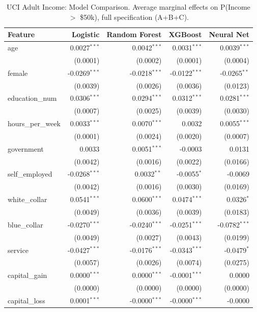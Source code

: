 \begin{table}[htbp]
\centering
\small
\begin{threeparttable}
\caption{UCI Adult Income: Model Comparison. Average marginal effects on P(Income $>$ \$50k), full specification (A+B+C).}
\label{tab:adult_model_comparison}
\begin{tabular}{lrrrr}
\toprule
Feature & Logistic & Random Forest & XGBoost & Neural Net \\
\midrule
age & 0.0027$^{***}$ & 0.0042$^{***}$ & 0.0031$^{***}$ & 0.0039$^{***}$ \\
 & (0.0001) & (0.0002) & (0.0001) & (0.0004) \\
female & -0.0269$^{***}$ & -0.0218$^{***}$ & -0.0122$^{***}$ & -0.0265$^{**}$ \\
 & (0.0039) & (0.0026) & (0.0036) & (0.0123) \\
education\_num & 0.0306$^{***}$ & 0.0294$^{***}$ & 0.0312$^{***}$ & 0.0281$^{***}$ \\
 & (0.0007) & (0.0025) & (0.0039) & (0.0030) \\
\midrule
hours\_per\_week & 0.0033$^{***}$ & 0.0070$^{***}$ & 0.0032 & 0.0055$^{***}$ \\
 & (0.0001) & (0.0024) & (0.0020) & (0.0007) \\
government & 0.0033 & 0.0051$^{***}$ & -0.0003 & 0.0131 \\
 & (0.0042) & (0.0016) & (0.0022) & (0.0166) \\
self\_employed & -0.0268$^{***}$ & 0.0032$^{**}$ & -0.0055$^{*}$ & -0.0069 \\
 & (0.0042) & (0.0016) & (0.0030) & (0.0169) \\
white\_collar & 0.0541$^{***}$ & 0.0600$^{***}$ & 0.0474$^{***}$ & 0.0326$^{*}$ \\
 & (0.0049) & (0.0036) & (0.0039) & (0.0183) \\
blue\_collar & -0.0270$^{***}$ & -0.0240$^{***}$ & -0.0251$^{***}$ & -0.0782$^{***}$ \\
 & (0.0049) & (0.0027) & (0.0043) & (0.0199) \\
service & -0.0427$^{***}$ & -0.0176$^{***}$ & -0.0343$^{***}$ & -0.0479$^{*}$ \\
 & (0.0057) & (0.0026) & (0.0074) & (0.0275) \\
\midrule
capital\_gain & 0.0000$^{***}$ & 0.0000$^{***}$ & -0.0001$^{***}$ & 0.0000 \\
 & (0.0000) & (0.0000) & (0.0000) & (0.0000) \\
capital\_loss & 0.0001$^{***}$ & -0.0000$^{***}$ & -0.0000$^{***}$ & -0.0000 \\

\end{tabular}
\end{threeparttable}
\end{table}
